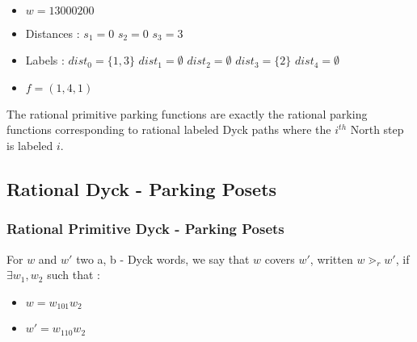 \begin{example}[$a < b : a = 3, b = 5,
    \mathcal{LR}_{a,b} \to \mathcal{PF}_{a,b}$]
    ~\
    \begin{itemize}
        \item $w = 13000200$
    \end{itemize}
    
    \begin{itemize}
        \item Distances :
            \subitem $s_1 = 0$
            \hspace{2cm} $s_2 = 0$
            \hspace{2cm} $s_3 = 3$
        \item Labels :
            \subitem $dist_0 = \{1, 3\}$
            \hspace{2cm} $dist_1 = \emptyset$
            \hspace{2cm} $dist_2 = \emptyset$
            \subitem $dist_3 = \{2\}$
            \hspace{2cm} $dist_4 = \emptyset$
        \item $f = (1, 4, 1)$
    \end{itemize}
\end{example}

\begin{rem}
    The rational primitive parking functions are exactly the
    rational parking functions corresponding to rational labeled
    Dyck paths where the $i^{th}$ North step is labeled $i$.
\end{rem}

\subsection{Rational Dyck - Parking Posets}

\subsubsection{Rational Primitive Dyck - Parking Posets}

\begin{definition}[$\gtrdot_r$]
    For $w$ and $w'$ two a, b - Dyck words, we say that $w$
    covers $w'$, written $w \gtrdot_r w'$, if
    $\exists w_1, w_2$ such that :
    \begin{itemize}
        \item $w = w_101w_2$
        \item $w' = w_110w_2$
    \end{itemize}  
\end{definition}

